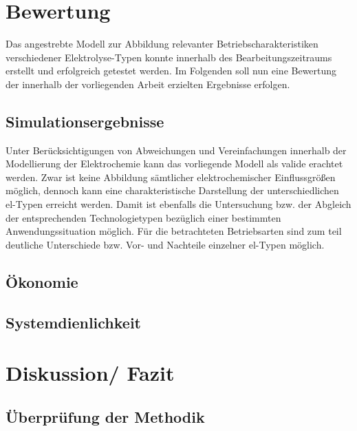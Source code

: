 \documentclass[onecolumn,10pt,titlepage]{article}
\begin{document}
\section{Bewertung}
Das angestrebte Modell zur Abbildung relevanter Betriebscharakteristiken verschiedener Elektrolyse-Typen konnte innerhalb des Bearbeitungszeitraums erstellt und erfolgreich getestet werden. Im Folgenden soll nun eine Bewertung der innerhalb der vorliegenden Arbeit erzielten Ergebnisse erfolgen. 
\subsection{Simulationsergebnisse}
Unter Berücksichtigungen von Abweichungen und Vereinfachungen innerhalb der Modellierung der Elektrochemie kann das vorliegende Modell als valide erachtet werden. Zwar ist keine Abbildung sämtlicher elektrochemischer Einflussgrößen möglich, dennoch kann eine charakteristische Darstellung der unterschiedlichen \gls{el}-Typen erreicht werden. Damit ist ebenfalls die Untersuchung bzw. der Abgleich der entsprechenden Technologietypen bezüglich einer bestimmten Anwendungssituation möglich. Für die betrachteten Betriebsarten sind zum teil deutliche Unterschiede bzw. Vor- und Nachteile einzelner \gls{el}-Typen möglich.

\subsection{Ökonomie}
\subsection{Systemdienlichkeit}


\section{Diskussion/ Fazit}

\subsection{Überprüfung der Methodik}
%
%
 
\end{document}
